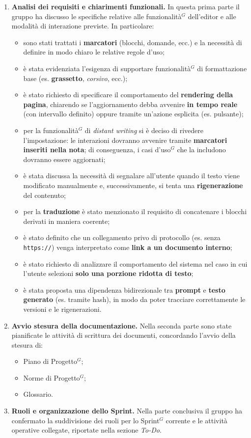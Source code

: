 \documentclass[a4paper,10pt]{article}
\begin{document}
\begin{enumerate}
  \item \textbf{Analisi dei requisiti e chiarimenti funzionali.}
  In questa prima parte il gruppo ha discusso le specifiche relative alle funzionalità$^G$ dell'editor e alle modalità di interazione previste. In particolare:
  \begin{itemize}
    \item sono stati trattati i \textbf{marcatori} (blocchi, domande, ecc.) e la necessità di definire in modo chiaro le relative regole d'uso;
    \item è stata evidenziata l'esigenza di supportare funzionalità$^G$ di formattazione base (es. \textbf{grassetto}, \textit{corsivo}, ecc.);
    \item è stato richiesto di specificare il comportamento del \textbf{rendering della pagina}, chiarendo se l'aggiornamento debba avvenire \textbf{in tempo reale} (con intervallo definito) oppure tramite un'azione esplicita (es. pulsante);
    \item per la funzionalità$^G$ di \emph{distant writing} si è deciso di rivedere l'impostazione: le interazioni dovranno avvenire tramite \textbf{marcatori inseriti nella nota}; di conseguenza, i casi d'uso$^G$ che la includono dovranno essere aggiornati;
    \item è stata discussa la necessità di segnalare all'utente quando il testo viene modificato manualmente e, successivamente, si tenta una \textbf{rigenerazione} del contenuto;
    \item per la \textbf{traduzione} è stato menzionato il requisito di concatenare i blocchi derivati in maniera coerente;
    \item è stato definito che un collegamento privo di protocollo (es. senza \texttt{https://}) venga interpretato come \textbf{link a un documento interno};
    \item è stato richiesto di analizzare il comportamento del sistema nel caso in cui l'utente selezioni \textbf{solo una porzione ridotta di testo};
    \item è stata proposta una dipendenza bidirezionale tra \textbf{prompt} e \textbf{testo generato} (es. tramite hash), in modo da poter tracciare correttamente le versioni e le rigenerazioni.
  \end{itemize}

  \item \textbf{Avvio stesura della documentazione.}
  Nella seconda parte sono state pianificate le attività di scrittura dei documenti, concordando l'avvio della stesura di:
  \begin{itemize}
    \item Piano di Progetto$^G$;
    \item Norme di Progetto$^G$;
    \item Glossario.
  \end{itemize}

  \item \textbf{Ruoli e organizzazione dello Sprint.}
  Nella parte conclusiva il gruppo ha confermato la suddivisione dei ruoli per lo Sprint$^G$ corrente e le attività operative collegate, riportate nella sezione \textit{To-Do}.
\end{enumerate}
\end{document}
